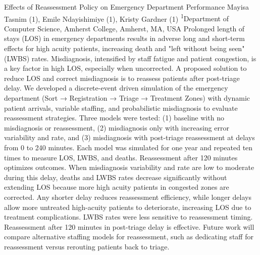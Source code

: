 \makeabstract
{
Effects of Reassessment Policy on Emergency Department Performance
}
{
Mayisa Tasnim (1), Emile Ndayishimiye (1), Kristy Gardner (1)
}
{
\textsuperscript{1}Department of Computer Science, Amherst College, Amherst, MA, USA
}
{
Prolonged length of stays (LOS) in emergency departments results in adverse long and short-term effects for high acuity patients, increasing death and "left without being seen" (LWBS) rates. Misdiagnosis, intensified by staff fatigue and patient congestion, is a key factor in high LOS, especially when uncorrected. A proposed solution to reduce LOS and correct misdiagnosis is to reassess patients after post-triage delay. 
}
{
We developed a discrete-event driven simulation of the emergency department (Sort → Registration → Triage → Treatment Zones) with dynamic patient arrivals, variable staffing, and probabilistic misdiagnosis to evaluate reassessment strategies. Three models were tested: (1) baseline with no misdiagnosis or reassessment, (2) misdiagnosis only with increasing error variability and rate, and (3) misdiagnosis with post-triage reassessment at delays from 0 to 240 minutes. Each model was simulated for one year and repeated ten times to measure LOS, LWBS, and deaths.
}
{
Reassessment after 120 minutes optimizes outcomes. When misdiagnosis variability and rate are low to moderate during this delay, deaths and LWBS rates decrease significantly without extending LOS because more high acuity patients in congested zones are corrected. Any shorter delay reduces reassessment efficiency, while longer delays allow more untreated high-acuity patients to deteriorate, increasing LOS due to treatment complications. LWBS rates were less sensitive to reassessment timing.
}
{
Reassessment after 120 minutes in post-triage delay is effective. Future work will compare alternative staffing models for reassessment, such as dedicating staff for reassessment versus rerouting patients back to triage.
}

\newpage
